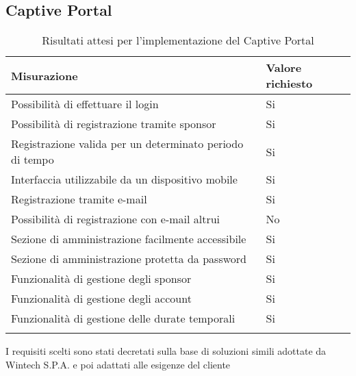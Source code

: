\documentclass[Tesi.tex]{subfiles}
\begin{document}
\newpage
\subsection{Captive Portal}
\label{table:Risultati attesi per l'implementazione del Captive Portal}
\renewcommand*{\arraystretch}{1.2}
\begin{longtable}[H]{p{9.5cm}p{3.4cm}}
	\rowcolor{CHeader}
	\color{CHeaderText} \textbf{Misurazione} & \color{CHeaderText} \textbf{Valore richiesto} \\
	\endhead
	Possibilità di effettuare il login &
	Si \\
	Possibilità di registrazione tramite sponsor &
	Si \\
	Registrazione valida per un determinato periodo di tempo &
	Si \\
	Interfaccia utilizzabile da un dispositivo mobile &
	Si \\
	Registrazione tramite e-mail &
	Si \\
	Possibilità di registrazione con e-mail altrui &
	No \\
	Sezione di amministrazione facilmente accessibile &
	Si \\
	Sezione di amministrazione protetta da password &
	Si \\
	Funzionalità di gestione degli sponsor &
	Si \\
	Funzionalità di gestione degli account &
	Si \\
	Funzionalità di gestione delle durate temporali &
	Si \\
	
	\hiderowcolors
	\caption{Risultati attesi per l'implementazione del Captive Portal}
\end{longtable}
I requisiti scelti sono stati decretati sulla base di soluzioni simili adottate da Wintech S.P.A. e poi adattati alle esigenze del cliente \\
\end{document}
